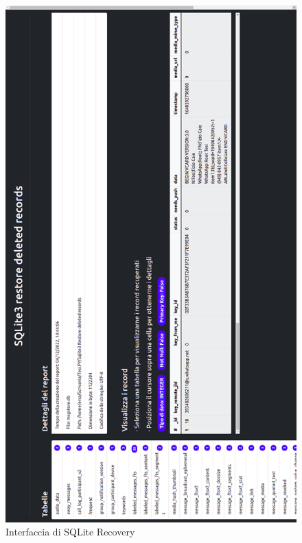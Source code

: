 \begin{figure}[ht]
	\centerline{\includegraphics[scale=0.35, ]{assets/interface}}
	\caption{Interfaccia di SQLite Recovery}
	\label{fig:interface}
\end{figure}


